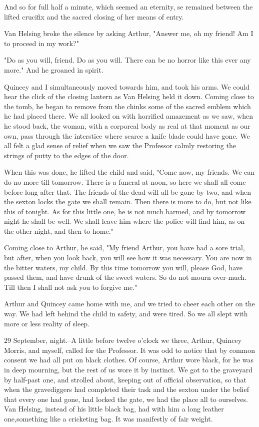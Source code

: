 And so for full half a minute, which seemed an eternity, se remained between the lifted crucifix and the sacred closing of her means of entry. 

Van Helsing broke the silence by asking Arthur, "Answer me, oh my friend! Am I to proceed in my work?" 

"Do as you will, friend. Do as you will. There can be no horror like this ever any more." And he groaned in spirit. 

Quincey and I simultaneously moved towards him, and took his arms. We could hear the click of the closing lantern as Van Helsing held it down. Coming close to the tomb, he began to remove from the chinks some of the sacred emblem which he had placed there. We all looked on with horrified amazement as we saw, when he stood back, the woman, with a corporeal body as real at that moment as our own, pass through the interstice where scarce a knife blade could have gone. We all felt a glad sense of relief when we saw the Professor calmly restoring the strings of putty to the edges of the door. 

When this was done, he lifted the child and said, "Come now, my friends. We can do no more till tomorrow. There is a funeral at noon, so here we shall all come before long after that. The friends of the dead will all be gone by two, and when the sexton locks the gate we shall remain. Then there is more to do, but not like this of tonight. As for this little one, he is not much harmed, and by tomorrow night he shall be well. We shall leave him where the police will find him, as on the other night, and then to home." 

Coming close to Arthur, he said, "My friend Arthur, you have had a sore trial, but after, when you look back, you will see how it was necessary. You are now in the bitter waters, my child. By this time tomorrow you will, please God, have passed them, and have drunk of the sweet waters. So do not mourn over-much. Till then I shall not ask you to forgive me." 

Arthur and Quincey came home with me, and we tried to cheer each other on the way. We had left behind the child in safety, and were tired. So we all slept with more or less reality of sleep. 

29 September, night.--A little before twelve o'clock we three, Arthur, Quincey Morris, and myself, called for the Professor. It was odd to notice that by common consent we had all put on black clothes. Of course, Arthur wore black, for he was in deep mourning, but the rest of us wore it by instinct. We got to the graveyard by half-past one, and strolled about, keeping out of official observation, so that when the gravediggers had completed their task and the sexton under the belief that every one had gone, had locked the gate, we had the place all to ourselves. Van Helsing, instead of his little black bag, had with him a long leather one,something like a cricketing bag. It was manifestly of fair weight. 

